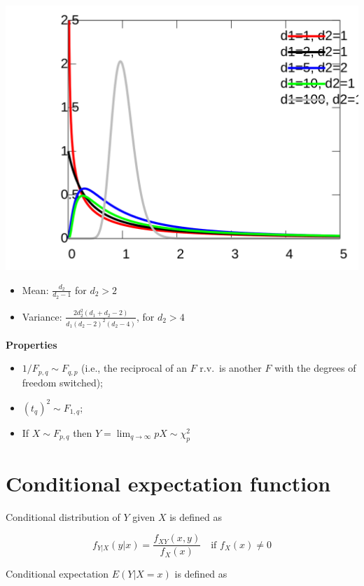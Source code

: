 \documentclass[DIV=14,titlepage=false]{scrreprt}
\begin{document}
\begin{minipage}[c]{0.5\textwidth}
  \includegraphics[width=\textwidth]{./Images/fdistribution.png}
  \end{minipage}
  \hfill
\begin{minipage}[c]{0.45\textwidth}
  \begin{itemize}
    \item Mean: $\frac{d_2}{d_2-1}$ for $d_2 > 2$
    \item Variance: $\frac{2 d_2^2 (d_1 + d_2 - 2)}{d_1 (d_2 - 2)^2 (d_2 - 4)}$, for $d_2>4$
  \end{itemize}
\end{minipage}

\textbf{Properties}
\begin{itemize}
  \item $ 1 / F_{p,q} \sim F_{q, p}  $ (i.e., the reciprocal of an $ F $ r.v.\ is another $ F $ with the degrees of freedom switched);
  \item $ (t_q)^2 \sim F_{1,q} $;
  \item If $X \sim F_{p,q}$ then $Y = \lim_{q \to \infty}pX \sim \chi^2_{p}$
\end{itemize}

\section{Conditional expectation function}

\begin{definition}
  Conditional distribution of \( Y \) given \( X \) is defined as

\[ f_{Y|X}(y|x) = \frac{f_{XY}(x, y)}{f_X(x)} \quad \text{if } f_X(x) \neq 0 \]  
\end{definition}
Conditional expectation \( E(Y|X = x) \) is defined as
\end{document}
